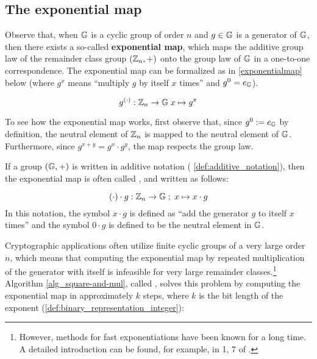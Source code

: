 \subsection{The exponential map}
Observe that, when $\mathbb{G}$ is a cyclic group of order $n$ and $g\in \mathbb{G}$ is a generator of $\mathbb{G}$, then there exists a so-called \textbf{exponential map}, which maps the additive group law of the remainder class group $(\mathbb{Z}_n,+)$ onto the group law of $\mathbb{G}$ in a one-to-one correspondence. The exponential map can be formalized as in \eqref{exponentialmap} below (where $g^x$ means ``multiply $g$ by itself $x$ times'' and $g^0=e_{\mathbb{G}}$).

\begin{equation}\label{exponentialmap}
g^{(\cdot)}: \mathbb{Z}_n \to \mathbb{G}\; x \mapsto g^x
\end{equation}

To see how the exponential map works, first observe that, since $g^0:=e_{\mathbb{G}}$ by definition, the neutral element of $\mathbb{Z}_n$ is mapped to the neutral element of $\mathbb{G}$. Furthermore, since $g^{x+y}=g^x\cdot g^y$, the map respects the group law.

\begin{notation}
\label{def:scalar_multiplication} If a group $(\mathbb{G},+)$ is written in additive notation (\notationname{} \ref{def:additive_notation}), then the exponential map is often called , and written as follows:

\begin{equation}\label{scalarmultiplication}
(\cdot)\cdot g: \mathbb{Z}_n \to \mathbb{G}\;;\; x \mapsto x\cdot g
\end{equation}
In this notation, the symbol $x\cdot g$  is defined as ``add the generator $g$ to itself $x$ times'' and the symbol $0\cdot g$ is defined to be the neutral element in $\mathbb{G}$.
\end{notation}

Cryptographic applications often utilize finite cyclic groups of a very large order $n$, which means that computing the exponential map by repeated multiplication of the generator with itself is infeasible for very large remainder classes.\footnote{However, methods for fast exponentiations have been known for a long time. A detailed introduction can be found, for example, in \chaptname{} 1, \secname{} 7 of \cite{mignotte-1992}. }
 Algorithm \ref{alg_square-and-mul}, called , solves this problem by computing the exponential map in approximately $k$ steps, where $k$ is the bit length of the exponent (\ref{def:binary_representation_integer}):

